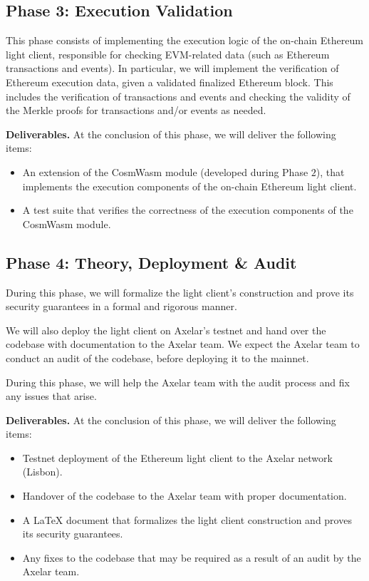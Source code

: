 \subsection{Phase 3: Execution Validation}

This phase consists of implementing the execution logic of the on-chain Ethereum light client, responsible for checking EVM-related data (such as Ethereum transactions and events). In particular, we will implement the verification of Ethereum execution data, given a validated finalized Ethereum block. This includes the verification of transactions and events and checking the validity of the Merkle proofs for transactions and/or events as needed.

\noindent
\textbf{Deliverables.} At the conclusion of this phase, we will deliver the following items:

\begin{itemize}
    \item An extension of the CosmWasm module (developed during Phase $2$), that implements the execution components of the on-chain Ethereum light client.
    \item A test suite that verifies the correctness of the execution components of the CosmWasm module.
\end{itemize}

\subsection{Phase 4: Theory, Deployment \& Audit}

During this phase, we will formalize the light client's construction and prove its security guarantees in a formal and rigorous manner.

We will also deploy the light client on Axelar's testnet and hand over the codebase with documentation to the Axelar team. We expect the Axelar team to conduct an audit of the codebase, before deploying it to the mainnet.

During this phase, we will help the Axelar team with the audit process and fix any issues that arise.

\noindent
\textbf{Deliverables.} At the conclusion of this phase, we will deliver the following items:
\begin{itemize}
  \item Testnet deployment of the Ethereum light client to the Axelar network (Lisbon).
  \item Handover of the codebase to the Axelar team with proper documentation.
  \item A LaTeX document that formalizes the light client construction and proves its security guarantees.
  \item Any fixes to the codebase that may be required as a result of an audit by the Axelar team.
\end{itemize}
